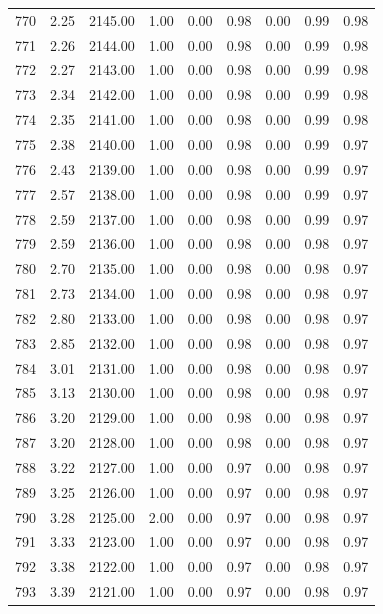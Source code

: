 \documentclass{article}\usepackage[]{graphicx}\usepackage[]{color}
\begin{document}
\begin{longtable}{rrrrrrrrr}
  770 & 2.25 & 2145.00 & 1.00 & 0.00 & 0.98 & 0.00 & 0.99 & 0.98 \\ 
  771 & 2.26 & 2144.00 & 1.00 & 0.00 & 0.98 & 0.00 & 0.99 & 0.98 \\ 
  772 & 2.27 & 2143.00 & 1.00 & 0.00 & 0.98 & 0.00 & 0.99 & 0.98 \\ 
  773 & 2.34 & 2142.00 & 1.00 & 0.00 & 0.98 & 0.00 & 0.99 & 0.98 \\ 
  774 & 2.35 & 2141.00 & 1.00 & 0.00 & 0.98 & 0.00 & 0.99 & 0.98 \\ 
  775 & 2.38 & 2140.00 & 1.00 & 0.00 & 0.98 & 0.00 & 0.99 & 0.97 \\ 
  776 & 2.43 & 2139.00 & 1.00 & 0.00 & 0.98 & 0.00 & 0.99 & 0.97 \\ 
  777 & 2.57 & 2138.00 & 1.00 & 0.00 & 0.98 & 0.00 & 0.99 & 0.97 \\ 
  778 & 2.59 & 2137.00 & 1.00 & 0.00 & 0.98 & 0.00 & 0.99 & 0.97 \\ 
  779 & 2.59 & 2136.00 & 1.00 & 0.00 & 0.98 & 0.00 & 0.98 & 0.97 \\ 
  780 & 2.70 & 2135.00 & 1.00 & 0.00 & 0.98 & 0.00 & 0.98 & 0.97 \\ 
  781 & 2.73 & 2134.00 & 1.00 & 0.00 & 0.98 & 0.00 & 0.98 & 0.97 \\ 
  782 & 2.80 & 2133.00 & 1.00 & 0.00 & 0.98 & 0.00 & 0.98 & 0.97 \\ 
  783 & 2.85 & 2132.00 & 1.00 & 0.00 & 0.98 & 0.00 & 0.98 & 0.97 \\ 
  784 & 3.01 & 2131.00 & 1.00 & 0.00 & 0.98 & 0.00 & 0.98 & 0.97 \\ 
  785 & 3.13 & 2130.00 & 1.00 & 0.00 & 0.98 & 0.00 & 0.98 & 0.97 \\ 
  786 & 3.20 & 2129.00 & 1.00 & 0.00 & 0.98 & 0.00 & 0.98 & 0.97 \\ 
  787 & 3.20 & 2128.00 & 1.00 & 0.00 & 0.98 & 0.00 & 0.98 & 0.97 \\ 
  788 & 3.22 & 2127.00 & 1.00 & 0.00 & 0.97 & 0.00 & 0.98 & 0.97 \\ 
  789 & 3.25 & 2126.00 & 1.00 & 0.00 & 0.97 & 0.00 & 0.98 & 0.97 \\ 
  790 & 3.28 & 2125.00 & 2.00 & 0.00 & 0.97 & 0.00 & 0.98 & 0.97 \\ 
  791 & 3.33 & 2123.00 & 1.00 & 0.00 & 0.97 & 0.00 & 0.98 & 0.97 \\ 
  792 & 3.38 & 2122.00 & 1.00 & 0.00 & 0.97 & 0.00 & 0.98 & 0.97 \\ 
  793 & 3.39 & 2121.00 & 1.00 & 0.00 & 0.97 & 0.00 & 0.98 & 0.97 \\ 

\end{longtable}
\end{document}
